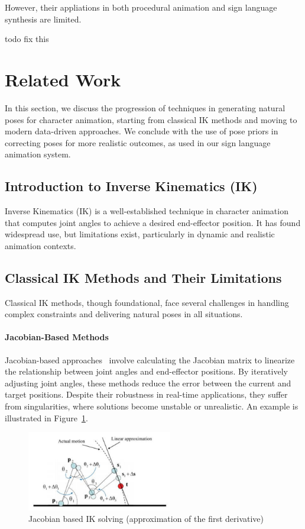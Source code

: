 \documentclass[../../main.tex]{subfiles}
\begin{document}
However, their appliations in both procedural animation and sign language synthesis are limited.


todo fix this

\section{Related Work}
\label{ch:pose_correction:related_work}

In this section, we discuss the progression of techniques in generating natural poses for character animation, starting from classical IK methods and moving to modern data-driven approaches. We conclude with the use of pose priors in correcting poses for more realistic outcomes, as used in our sign language animation system.

\subsection{Introduction to Inverse Kinematics (IK)}
\label{ch:pose_correction:related_work:intro_ik}
Inverse Kinematics (IK) is a well-established technique in character animation that computes joint angles to achieve a desired end-effector position. It has found widespread use, but limitations exist, particularly in dynamic and realistic animation contexts.

\subsection{Classical IK Methods and Their Limitations}
\label{ch:pose_correction:related_work:classical_ik}
Classical IK methods, though foundational, face several challenges in handling complex constraints and delivering natural poses in all situations.

\paragraph{Jacobian-Based Methods} Jacobian-based approaches~\cite{4648032} involve calculating the Jacobian matrix to linearize the relationship between joint angles and end-effector positions. By iteratively adjusting joint angles, these methods reduce the error between the current and target positions. Despite their robustness in real-time applications, they suffer from singularities, where solutions become unstable or unrealistic. An example is illustrated in Figure~\ref{fig:jacobian_based}.

\begin{figure}
    \centering \includegraphics[width = 2.5in]{chapters/pose_correction/images/jacobian_based.png}
    \caption{Jacobian based IK solving (approximation of the first derivative)}
    \label{fig:jacobian_based}
\end{figure}
\end{document}
